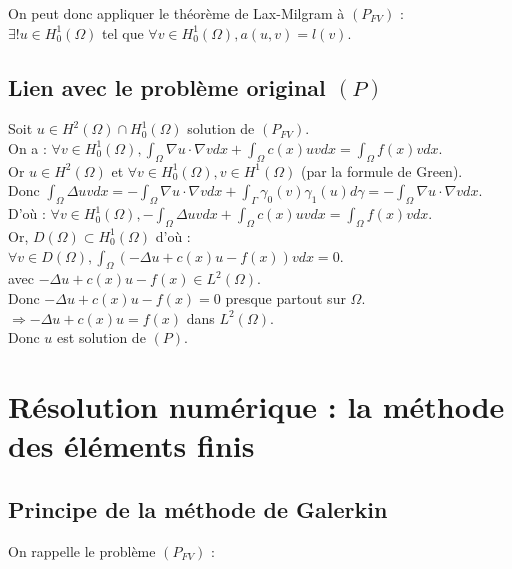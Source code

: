 \documentclass[12pt,a4paper]{article}
\begin{document}
\noindent On peut donc appliquer le théorème de Lax-Milgram à $(P_{FV})$ : \\
$\exists ! u \in H^1_0(\Omega)$ tel que $\forall v \in H^1_0(\Omega), a(u, v) = l(v)$.


\subsection{Lien avec le problème original $(P)$}

Soit $u \in H^2(\Omega) \cap H^1_0(\Omega)$ solution de $(P_{FV})$. \\
On a : $\forall v \in H^1_0(\Omega), \int_{\Omega} \nabla u \cdot \nabla v dx + \int_{\Omega} c(x)uv dx = \int_{\Omega} f(x)v dx$. \\

Or $u \in H^2(\Omega)$ et $\forall v \in H^1_0(\Omega), v \in H^1(\Omega)$ (par la formule de Green). \\
Donc $\int_{\Omega} \Delta u v dx = - \int_{\Omega} \nabla u \cdot \nabla v dx + \int_{\Gamma} \gamma_0(v) \gamma_1(u) d\gamma = - \int_{\Omega} \nabla u \cdot \nabla v dx$. \\

D'où : $\forall v \in H^1_0(\Omega), -\int_{\Omega} \Delta u v dx + \int_{\Omega} c(x)uv dx = \int_{\Omega} f(x)v dx$. \\

Or, $D(\Omega) \subset H^1_0(\Omega)$ d'où : $\forall v \in D(\Omega), \int_{\Omega} (-\Delta u + c(x)u - f(x))v dx = 0$. \\
avec $-\Delta u + c(x)u - f(x) \in L^2(\Omega)$. \\
Donc $-\Delta u + c(x)u - f(x) = 0$ presque partout sur $\Omega$. \\
$\Rightarrow -\Delta u + c(x)u = f(x)$ dans $L^2(\Omega)$. \\

Donc $u$ est solution de $(P)$.

\newpage

\section{Résolution numérique : la méthode des éléments finis}

\subsection{Principe de la méthode de Galerkin}

On rappelle le problème $(P_{FV})$ :
\end{document}
